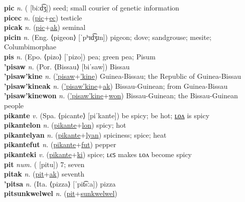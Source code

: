 \textbf{pic} \textit{n.} ( [biːd͡ʒ])
seed; small courier of genetic information \label{pic} \\
\textbf{picec} \textit{n.} (\hyperref[pic]{pic}+\hyperref[ec]{ec})
testicle \label{picec} \\
\textbf{picak} \textit{n.} (\hyperref[pic]{pic}+\hyperref[ak]{ak})
seminal \label{picak} \\
\textbf{picin} \textit{n.} (Eng. ⟨pigeon⟩ [ˈpʰɪd͡ʒɪn])
pigeon; dove; sandgrouse; mesite; Columbimorphae \label{picin} \\
\textbf{pis} \textit{n.} (Epo. ⟨pizo⟩ [ˈpizo])
pea; green pea; Pisum \label{pis} \\
\textbf{'pisaw} \textit{n.} (Por. ⟨Bissau⟩ [biˈsaw])
Bissau \label{'pisaw} \\
\textbf{'pisaw'kine} \textit{n.} (\hyperref['pisaw]{'pisaw}+\hyperref['kine]{'kine})
Guinea-Bissau; the Republic of Guinea-Bissau \label{'pisaw'kine} \\
\textbf{'pisaw'kineak} \textit{n.} (\hyperref['pisaw'kine]{'pisaw'kine}+\hyperref[ak]{ak})
Bissau-Guinean; from Guinea-Bissau \label{'pisaw'kineak} \\
\textbf{'pisaw'kinewon} \textit{n.} (\hyperref['pisaw'kine]{'pisaw'kine}+\hyperref[won]{won})
Bissau-Guinean; the Bissau-Guinean people \label{'pisaw'kinewon} \\
\textbf{pikante} \textit{v.} (Spa. ⟨picante⟩ [piˈkante])
be spicy; be hot; \hyperref[pikantelon]{ʟᴏᴧ} is spicy \label{pikante} \\
\textbf{pikantelon} \textit{n.} (\hyperref[pikante]{pikante}+\hyperref[lon]{lon})
spicy; hot \label{pikantelon} \\
\textbf{pikantelyan} \textit{n.} (\hyperref[pikante]{pikante}+\hyperref[lyan]{lyan})
spiciness; spice; heat \label{pikantelyan} \\
\textbf{pikantefut} \textit{n.} (\hyperref[pikante]{pikante}+\hyperref[fut]{fut})
pepper \label{pikantefut} \\
\textbf{pikanteki} \textit{v.} (\hyperref[pikante]{pikante}+\hyperref[ki]{ki})
spice; ʟєꜱ makes ʟᴏᴧ become spicy \label{pikanteki} \\
\textbf{pit} \textit{num.} ( [pitu])
7; seven \label{pit} \\
\textbf{pitak} \textit{n.} (\hyperref[pit]{pit}+\hyperref[ak]{ak})
seventh \label{pitak} \\
\textbf{'pitsa} \textit{n.} (Ita. ⟨pizza⟩ [ˈpit͡sːa])
pizza \label{'pitsa} \\
\textbf{pitsunkwelwel} \textit{n.} (\hyperref[pit]{pit}+\hyperref[sunkwelwel]{sunkwelwel})
